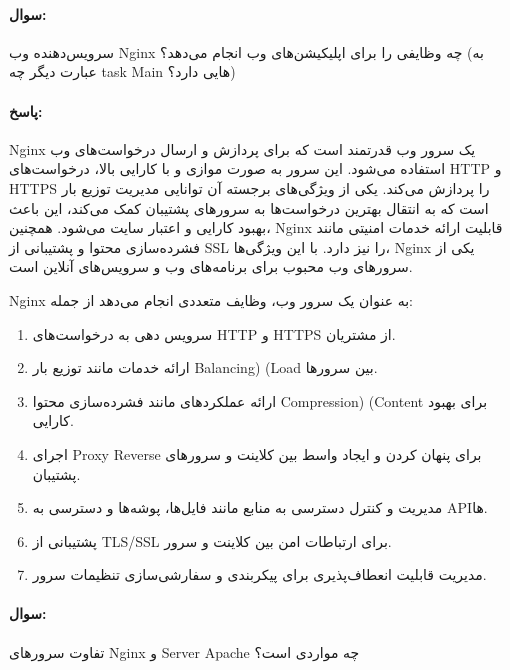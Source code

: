 \documentclass[a4paper,10pt]{article}
\begin{document}
    \paragraph{سوال:} سرویس‌دهنده وب Nginx چه وظایفی را برای اپلیکیشن‌های وب انجام می‌دهد؟ (به عبارت دیگر چه task Main هایی دارد؟)

    \paragraph{پاسخ:} Nginx یک سرور وب قدرتمند است که برای پردازش و ارسال درخواست‌های وب استفاده می‌شود. این سرور به صورت موازی و با کارایی بالا، درخواست‌های HTTP و HTTPS را پردازش می‌کند. یکی از ویژگی‌های برجسته آن توانایی مدیریت توزیع بار است که به انتقال بهترین درخواست‌ها به سرورهای پشتیبان کمک می‌کند، این باعث بهبود کارایی و اعتبار سایت می‌شود. همچنین، Nginx قابلیت ارائه خدمات امنیتی مانند فشرده‌سازی محتوا و پشتیبانی از SSL را نیز دارد. با این ویژگی‌ها، Nginx یکی از سرورهای وب محبوب برای برنامه‌های وب و سرویس‌های آنلاین است.
    
    Nginx به عنوان یک سرور وب، وظایف متعددی انجام می‌دهد از جمله:

    \begin{enumerate}
        
        \item سرویس دهی به درخواست‌های HTTP و HTTPS از مشتریان.

        \item ارائه خدمات مانند توزیع بار Balancing) (Load بین سرورها.

        \item ارائه عملکردهای مانند فشرده‌سازی محتوا Compression) (Content برای بهبود کارایی.

        \item اجرای Proxy Reverse برای پنهان کردن و ایجاد واسط بین کلاینت و سرورهای پشتیبان.

        \item مدیریت و کنترل دسترسی به منابع مانند فایل‌ها، پوشه‌ها و دسترسی به API‌ها.

        \item پشتیبانی از TLS/SSL برای ارتباطات امن بین کلاینت و سرور.

        \item مدیریت قابلیت انعطاف‌پذیری برای پیکربندی و سفارشی‌سازی تنظیمات سرور.

    \end{enumerate}

    \noindent\hrulefill

    \paragraph{سوال:} تفاوت سرورهای Nginx و Server Apache چه مواردی است؟
\end{document}
